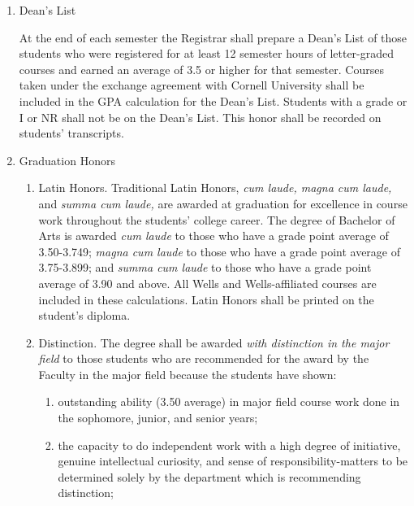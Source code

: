 \documentclass{manual}
\newcommand{\modified}[1]{}
\newcommand{\oldbreak}[1]{}
\newcommand{\itemLevelA}{\alph*.}
\newcommand{\itemLevelB}{\arabic*)}
\newcommand{\itemRefA}{\alph*}
\newcommand{\itemRefB}{\arabic*}
\begin{document}
\begin{enumerate}[label=\itemLevelA,ref=\itemRefA]

\item Dean's List

At the end of each semester the Registrar shall prepare a Dean's List of those students who were registered for at least 12 semester hours of letter-graded courses and earned an average of 3.5 or higher for that semester. Courses taken under the exchange agreement with Cornell University shall be included in the GPA calculation for the Dean's List. Students with a grade or I or NR shall not be on the Dean's List. This honor shall be recorded on students' transcripts.

\item Graduation Honors  \modified{5/13/97}

\begin{enumerate}[label=\itemLevelB,ref=\itemRefB]

\item Latin Honors. Traditional Latin Honors, \textit{cum laude, magna cum laude, }and \textit{summa cum laude, }are awarded at graduation for excellence in course work throughout the students' college career. The degree of Bachelor of Arts is awarded \textit{cum laude }to those who have a grade point average of 3.50-3.749; \textit{magna cum laude }to those who have a grade point average of 3.75-3.899; and \textit{summa cum laude }to those who have a grade point average of 3.90 and above. All Wells and Wells-affiliated courses are included in these calculations. Latin Honors shall be printed on the student's diploma.



\oldbreak{VII-1}

\item Distinction. The degree shall be awarded \textit{with distinction in the major field }to those students who are recommended for the award by the Faculty in the major field because the students have shown:

\begin{enumerate}[label=\alph*)]

\item outstanding ability (3.50 average) in major field course work done in the sophomore, junior, and senior years;

\item the capacity to do independent work with a high degree of initiative, genuine intellectual curiosity, and sense of responsibility-matters to be determined solely by the department which is recommending distinction;


\end{enumerate}
\end{enumerate}
\end{enumerate}
\end{document}
